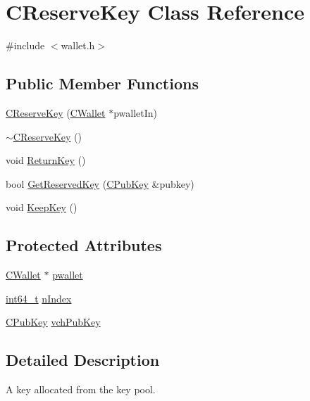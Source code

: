 \hypertarget{class_c_reserve_key}{}\section{C\+Reserve\+Key Class Reference}
\label{class_c_reserve_key}


{\ttfamily \#include $<$wallet.\+h$>$}

\subsection*{Public Member Functions}
\begin{DoxyCompactItemize}
\item 
\hyperlink{class_c_reserve_key_ab5c15654a1e28bf5f2852512381d07c4}{C\+Reserve\+Key} (\hyperlink{class_c_wallet}{C\+Wallet} $\ast$pwallet\+In)
\item 
\hyperlink{class_c_reserve_key_a71dc4f86968df51ffa263371fdb93f3f}{$\sim$\+C\+Reserve\+Key} ()
\item 
void \hyperlink{class_c_reserve_key_af7b0a61f8c70c8146e42e82b4e227204}{Return\+Key} ()
\item 
bool \hyperlink{class_c_reserve_key_ad198d2d7a54d315c60805ba1cb0caf7c}{Get\+Reserved\+Key} (\hyperlink{class_c_pub_key}{C\+Pub\+Key} \&pubkey)
\item 
void \hyperlink{class_c_reserve_key_a493d06f41ca9571f2a42c8581a3952d8}{Keep\+Key} ()
\end{DoxyCompactItemize}
\subsection*{Protected Attributes}
\begin{DoxyCompactItemize}
\item 
\hyperlink{class_c_wallet}{C\+Wallet} $\ast$ \hyperlink{class_c_reserve_key_aab8a4052c0b9a4337248ae53e77c6115}{pwallet}
\item 
\hyperlink{stdint_8h_adec1df1b8b51cb32b77e5b86fff46471}{int64\+\_\+t} \hyperlink{class_c_reserve_key_a16d05c9be039eb772f2daf412cca1991}{n\+Index}
\item 
\hyperlink{class_c_pub_key}{C\+Pub\+Key} \hyperlink{class_c_reserve_key_a2b252444577b6aca8b497c2207ff17a4}{vch\+Pub\+Key}
\end{DoxyCompactItemize}


\subsection{Detailed Description}
A key allocated from the key pool. 

